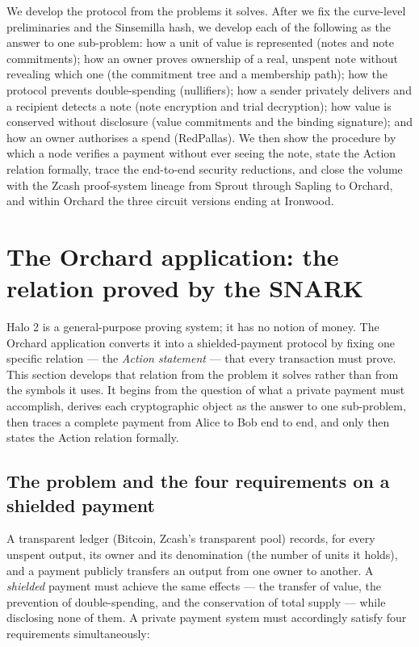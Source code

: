 \documentclass[11pt,a4paper]{article}
\theoremstyle{definition}
\begin{document}
We develop the protocol from the problems it solves. After
we fix the curve-level preliminaries and the Sinsemilla hash, we develop each of the following
as the answer to one sub-problem: how a unit of value is represented (notes and note commitments); how
an owner proves ownership of a real, unspent note without revealing which one (the commitment tree and a
membership path); how the protocol prevents double-spending (nullifiers); how
a sender privately delivers and a recipient detects a note (note encryption and trial decryption); how value
is conserved without disclosure (value commitments and the binding signature); and how an owner authorises a
spend (RedPallas). We then
show the procedure by which a node verifies a payment without ever seeing the
note, state the Action relation formally, trace the end-to-end security reductions, and close the volume with the Zcash
proof-system lineage from Sprout through Sapling to Orchard, and within
Orchard the three circuit versions ending at Ironwood.

\section{The Orchard application: the relation proved by the SNARK}\label{sec:orchard-app}

Halo 2 is a general-purpose proving system; it has no notion of money.
The Orchard application converts it into a shielded-payment protocol by
fixing one specific relation --- the \emph{Action statement} --- that
every transaction must prove. This section develops that relation from the
problem it solves rather than from the symbols it uses. It begins from the
question of what a private payment must accomplish,
derives each cryptographic object as the answer to one sub-problem, then
traces a complete payment from Alice to Bob end to end, and only then states
the Action relation formally.

\subsection{The problem and the four requirements on a shielded payment}\label{sec:orchard-problem}

A transparent ledger (Bitcoin, Zcash's transparent pool) records, for
every unspent output, its owner and its denomination (the number of units it holds),
and a payment publicly
transfers an output from one owner to another. A \emph{shielded} payment must achieve
the same effects --- the transfer of value, the prevention of double-spending, and the conservation of total
supply --- while disclosing none of them. A private
payment system must accordingly satisfy four requirements
simultaneously:
\end{document}
